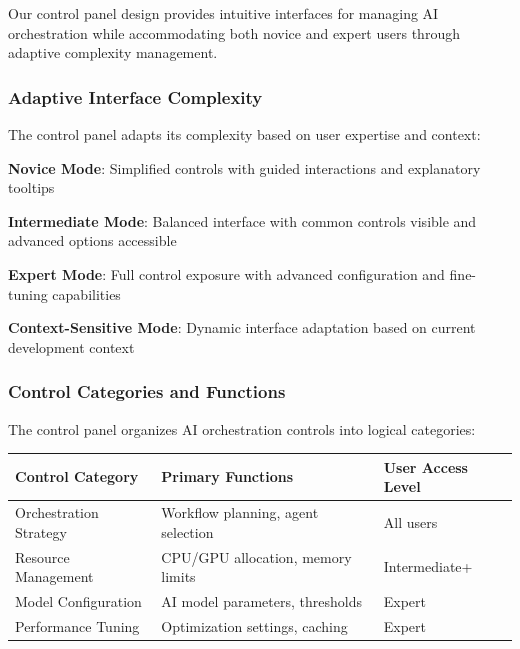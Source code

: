 Our control panel design provides intuitive interfaces for managing AI orchestration while accommodating both novice and expert users through adaptive complexity management.

\subsubsection*{Adaptive Interface Complexity}

The control panel adapts its complexity based on user expertise and context:

\begin{expandedlist}
    \item \textbf{Novice Mode}: Simplified controls with guided interactions and explanatory tooltips
    \item \textbf{Intermediate Mode}: Balanced interface with common controls visible and advanced options accessible
    \item \textbf{Expert Mode}: Full control exposure with advanced configuration and fine-tuning capabilities
    \item \textbf{Context-Sensitive Mode}: Dynamic interface adaptation based on current development context
\end{expandedlist}

\subsubsection*{Control Categories and Functions}

The control panel organizes AI orchestration controls into logical categories:

\begin{center}
\begin{tabular}{@{}lll@{}}
\toprule
\textbf{Control Category} & \textbf{Primary Functions} & \textbf{User Access Level} \\
\midrule
Orchestration Strategy & Workflow planning, agent selection & All users \\
Resource Management & CPU/GPU allocation, memory limits & Intermediate+ \\
Model Configuration & AI model parameters, thresholds & Expert \\
Performance Tuning & Optimization settings, caching & Expert \\
\bottomrule
\end{tabular}
\end{center}

